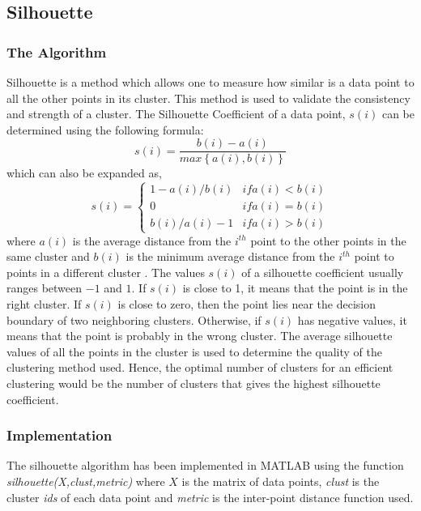 \documentclass{lmproj}
\begin{document}
\subsection{Silhouette}
\subsubsection{The Algorithm}
Silhouette is a method which allows one to measure how similar is a data point to all the other points in its cluster. This method is used to validate the consistency and strength of a cluster. The Silhouette Coefficient of a data point, $s(i)$ can be determined using the following formula:
\begin{equation}
s(i) = \frac{b(i) - a(i)}{max\left\{a(i), b(i)\right\}}
\end{equation}
which can also be expanded as,
\begin{equation}
s(i) = \begin{cases}
1-a(i)/b(i) & if a(i)<b(i)
\\0 & if a(i)=b(i)
\\b(i)/a(i) -1 & if a(i)>b(i)
\end{cases}
\end{equation}
where $a(i)$ is the average distance from the $i^{th}$ point to the other points in the same cluster and $b(i)$ is the minimum average distance from the $i^{th}$ point to points in a different cluster \cite{Rousseeuw}. The values $s(i)$ of a silhouette coefficient usually ranges between $-1$ and $1$. If $s(i)$ is close to 1, it means that the point is in the right cluster. If $s(i)$ is close to zero, then the point lies near the decision boundary of two neighboring clusters. Otherwise, if $s(i)$ has negative values, it means that the point is probably in the wrong cluster. The average silhouette values of all the points in the cluster is used to determine the quality of the clustering method used. Hence, the optimal number of clusters for an efficient clustering would be the number of clusters that gives the highest silhouette coefficient.

\subsubsection{Implementation}
The silhouette algorithm has been implemented in MATLAB using the function \textit{silhouette(X,clust,metric)} where $X$ is the matrix of data points, \textit{clust} is the cluster \textit{ids} of each data point and \textit{metric} is the inter-point distance function used. 
\end{document}
